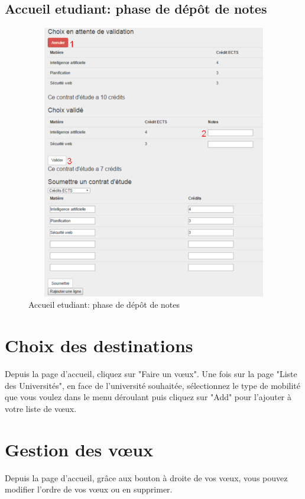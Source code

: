   \subsection{Accueil etudiant: phase de dépôt de notes}
  \begin{figure}[H]
  	\centering
  	
  	\includegraphics[width=14cm,height=12cm]{Images/Etudiant/notes_etud.png}
  	\caption{Accueil etudiant: phase de dépôt de notes}
  	\label{pn}
  \end{figure}



\section{Choix des destinations}

Depuis la page d'accueil, cliquez sur "Faire un vœux". Une fois sur la page "Liste des Universités", en face de l'université souhaitée, sélectionnez le type de mobilité que vous voulez dans le menu déroulant puis cliquez sur "Add" pour l'ajouter à votre liste de vœux.   
 
\section{Gestion des vœux}

Depuis la page d'accueil, grâce aux bouton à droite de vos vœux, vous pouvez modifier l'ordre de vos vœux ou en supprimer.

